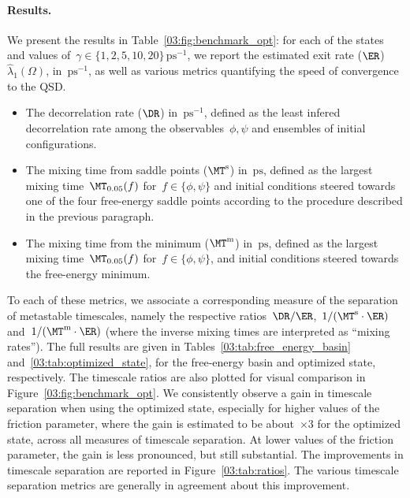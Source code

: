 \paragraph{Results.}
We present the results in Table~\ref{03:fig:benchmark_opt}: for each of the states and values of~$\gamma\in\{1,2,5,10,20\}\,\mathrm{ps}^{-1}$, we report the estimated exit rate ($\ER$)~$\widehat{\lambda}_1(\Omega)$, in~$\mathrm{ps}^{-1}$, as well as various metrics quantifying the speed of convergence to the QSD.
\begin{itemize}
    \item{The decorrelation rate ($\DR$) in~$\mathrm{ps}^{-1}$, defined as the least infered decorrelation rate among the observables~$\phi,\psi$ and ensembles of initial configurations.}
    \item{The mixing time from saddle points ($\MT^{\mathrm{s}}$) in~$\mathrm{ps}$, defined as the largest mixing time~$\MT_{0.05}(f)$ for~$f\in\{\phi,\psi\}$ and initial conditions steered towards one of the four free-energy saddle points according to the procedure described in the previous paragraph.}
    \item{The mixing time from the minimum ($\MT^{\mathrm{m}}$) in~$\mathrm{ps}$, defined as the largest mixing time~$\MT_{0.05}(f)$ for~$f\in\{\phi,\psi\}$, and initial conditions steered towards the free-energy minimum.}
\end{itemize}
To each of these metrics, we associate a corresponding measure of the separation of metastable timescales, namely the respective ratios~$\DR/\ER$,~$1/(\MT^{\mathrm{s}}\cdot\ER)$ and~$1/(\MT^{\mathrm{m}}\cdot\ER)$ (where the inverse mixing times are interpreted as ``mixing rates'').
The full results are given in Tables~\ref{03:tab:free_energy_basin} and~\ref{03:tab:optimized_state}, for the free-energy basin and optimized state, respectively. The timescale ratios are also plotted for visual comparison in Figure~\ref{03:fig:benchmark_opt}. We consistently observe a gain in timescale separation when using the optimized state, especially for higher values of the friction parameter, where the gain is estimated to be about~$\times 3$ for the optimized state, across all measures of timescale separation. At lower values of the friction parameter, the gain is less pronounced, but still substantial.
The improvements in timescale separation are reported in Figure~\ref{03:tab:ratios}. The various timescale separation metrics are generally in agreement about this improvement.
